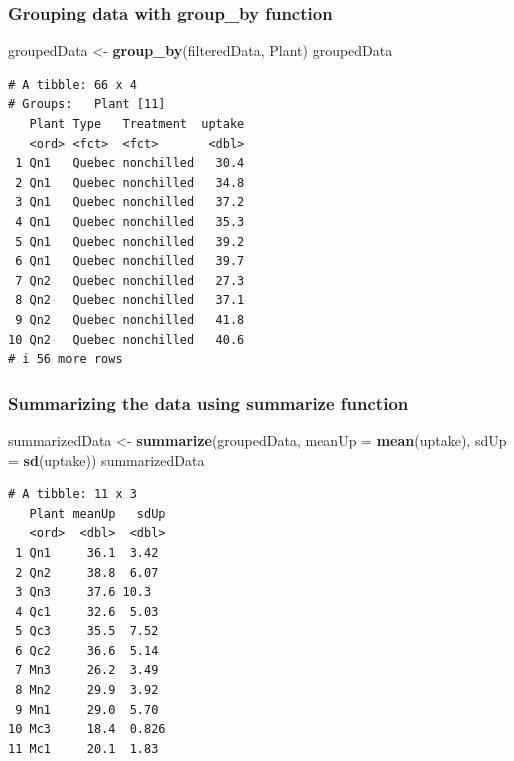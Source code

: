 \documentclass[
]{article}
\newenvironment{Shaded}{\begin{snugshade}}{\end{snugshade}}
\newcommand{\AttributeTok}[1]{\textcolor[rgb]{0.13,0.29,0.53}{#1}}
\newcommand{\FunctionTok}[1]{\textcolor[rgb]{0.13,0.29,0.53}{\textbf{#1}}}
\newcommand{\NormalTok}[1]{#1}
\newcommand{\OtherTok}[1]{\textcolor[rgb]{0.56,0.35,0.01}{#1}}
\begin{document}
\subsubsection{Grouping data with group\_by
function}\label{grouping-data-with-group_by-function}

\begin{Shaded}
\begin{Highlighting}[]
\NormalTok{groupedData }\OtherTok{\textless{}{-}} \FunctionTok{group\_by}\NormalTok{(filteredData, Plant)}
\NormalTok{groupedData}
\end{Highlighting}
\end{Shaded}

\begin{verbatim}
# A tibble: 66 x 4
# Groups:   Plant [11]
   Plant Type   Treatment  uptake
   <ord> <fct>  <fct>       <dbl>
 1 Qn1   Quebec nonchilled   30.4
 2 Qn1   Quebec nonchilled   34.8
 3 Qn1   Quebec nonchilled   37.2
 4 Qn1   Quebec nonchilled   35.3
 5 Qn1   Quebec nonchilled   39.2
 6 Qn1   Quebec nonchilled   39.7
 7 Qn2   Quebec nonchilled   27.3
 8 Qn2   Quebec nonchilled   37.1
 9 Qn2   Quebec nonchilled   41.8
10 Qn2   Quebec nonchilled   40.6
# i 56 more rows
\end{verbatim}

\subsubsection{Summarizing the data using summarize
function}\label{summarizing-the-data-using-summarize-function}

\begin{Shaded}
\begin{Highlighting}[]
\NormalTok{summarizedData }\OtherTok{\textless{}{-}} \FunctionTok{summarize}\NormalTok{(groupedData, }\AttributeTok{meanUp =} \FunctionTok{mean}\NormalTok{(uptake),}
                            \AttributeTok{sdUp =} \FunctionTok{sd}\NormalTok{(uptake))}
\NormalTok{summarizedData}
\end{Highlighting}
\end{Shaded}

\begin{verbatim}
# A tibble: 11 x 3
   Plant meanUp   sdUp
   <ord>  <dbl>  <dbl>
 1 Qn1     36.1  3.42 
 2 Qn2     38.8  6.07 
 3 Qn3     37.6 10.3  
 4 Qc1     32.6  5.03 
 5 Qc3     35.5  7.52 
 6 Qc2     36.6  5.14 
 7 Mn3     26.2  3.49 
 8 Mn2     29.9  3.92 
 9 Mn1     29.0  5.70 
10 Mc3     18.4  0.826
11 Mc1     20.1  1.83 
\end{verbatim}
\end{document}
